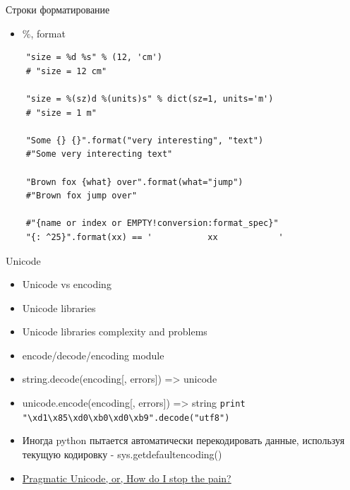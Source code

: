 \documentclass{article}
\begin{document}
\begin{center} Строки форматирование \end{center}
\begin{itemize}
	\item \%, format
\end{itemize}

\vspace{15pt}
\begin{lstlisting}
	"size = %d %s" % (12, 'cm') 
	# "size = 12 cm"

	"size = %(sz)d %(units)s" % dict(sz=1, units='m') 
	# "size = 1 m"

	"Some {} {}".format("very interesting", "text")
	#"Some very interecting text"

	"Brown fox {what} over".format(what="jump")
	#"Brown fox jump over"

	#"{name or index or EMPTY!conversion:format_spec}"
	"{: ^25}".format(xx) == '           xx            '
\end{lstlisting}
\newpage

\begin{center} Unicode \end{center}
\begin{itemize}
	\item Unicode vs encoding
	\item Unicode libraries
	\item Unicode libraries complexity and problems
	\item encode/decode/encoding module
	\item string.decode(encoding[, errors]) => unicode
	\item unicode.encode(encoding[, errors]) => string
	\lstinline!print "\xd1\x85\xd0\xb0\xd0\xb9".decode("utf8")!
	\item Иногда python пытается автоматически перекодировать 
			данные, используя текущую кодировку - sys.getdefaultencoding()
	\item \href{http://www.youtube.com/watch?feature=player_embedded&v=sgHbC6udIqc}
				{Pragmatic Unicode, or, How do I stop the pain?}
\end{itemize}
\newpage
\end{document}
